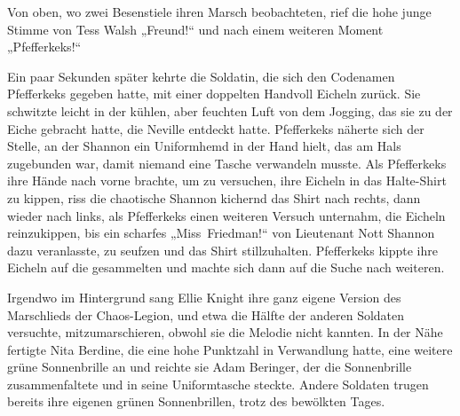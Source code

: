 Von oben, wo zwei Besenstiele ihren Marsch beobachteten, rief die hohe junge Stimme von Tess Walsh „Freund!“ und nach einem weiteren Moment „Pfefferkeks!“

Ein paar Sekunden später kehrte die Soldatin, die sich den Codenamen Pfefferkeks gegeben hatte, mit einer doppelten Handvoll Eicheln zurück. Sie schwitzte leicht in der kühlen, aber feuchten Luft von dem Jogging, das sie zu der Eiche gebracht hatte, die Neville entdeckt hatte. Pfefferkeks näherte sich der Stelle, an der Shannon ein Uniformhemd in der Hand hielt, das am Hals zugebunden war, damit niemand eine Tasche verwandeln musste. Als Pfefferkeks ihre Hände nach vorne brachte, um zu versuchen, ihre Eicheln in das Halte-Shirt zu kippen, riss die chaotische Shannon kichernd das Shirt nach rechts, dann wieder nach links, als Pfefferkeks einen weiteren Versuch unternahm, die Eicheln reinzukippen, bis ein scharfes „Miss~Friedman!“ von Lieutenant Nott Shannon dazu veranlasste, zu seufzen und das Shirt stillzuhalten. Pfefferkeks kippte ihre Eicheln auf die gesammelten und machte sich dann auf die Suche nach weiteren.

Irgendwo im Hintergrund sang Ellie Knight ihre ganz eigene Version des Marschlieds der Chaos-Legion, und etwa die Hälfte der anderen Soldaten versuchte, mitzumarschieren, obwohl sie die Melodie nicht kannten. In der Nähe fertigte Nita Berdine, die eine hohe Punktzahl in Verwandlung hatte, eine weitere grüne Sonnenbrille an und reichte sie Adam Beringer, der die Sonnenbrille zusammenfaltete und in seine Uniformtasche steckte. Andere Soldaten trugen bereits ihre eigenen grünen Sonnenbrillen, trotz des bewölkten Tages.

